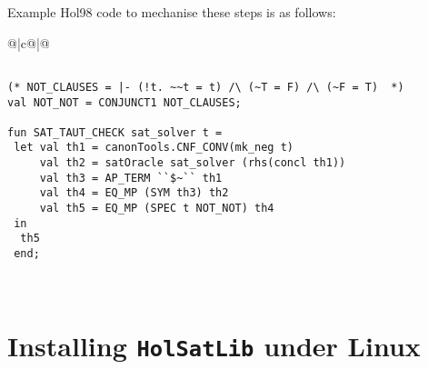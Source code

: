 \documentclass[12pt]{article}
\makeatletter
\newcommand\Hol{Hol98\xspace}
\newlength{\hsbw}
\newcommand\MLSpacing{13pt}
\newenvironment{session}{\begin{flushleft}
 \begin{tabular}{@{}|c@{}|@{}}\hline 
 \begin{minipage}[b]{\hsbw}
 \begingroup\small\baselineskip\MLSpacing}{\endgroup\end{minipage}\\ \hline 
 \end{tabular}
 \end{flushleft}}
\makeatother
\begin{document}
Example \Hol code to mechanise these steps is as follows:

\begin{session}\begin{verbatim}

(* NOT_CLAUSES = |- (!t. ~~t = t) /\ (~T = F) /\ (~F = T)  *)
val NOT_NOT = CONJUNCT1 NOT_CLAUSES;

fun SAT_TAUT_CHECK sat_solver t =
 let val th1 = canonTools.CNF_CONV(mk_neg t)
     val th2 = satOracle sat_solver (rhs(concl th1))
     val th3 = AP_TERM ``$~`` th1
     val th4 = EQ_MP (SYM th3) th2
     val th5 = EQ_MP (SPEC t NOT_NOT) th4
 in
  th5
 end;

\end{verbatim}\end{session}

\section{Installing {\tt HolSatLib} under Linux}\label{install}
\end{document}
